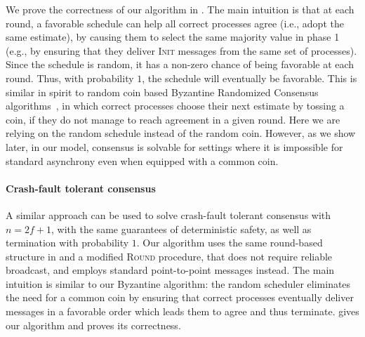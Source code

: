 We prove the correctness of our algorithm in . The main intuition is that at each round, a favorable schedule can help all correct processes agree (i.e., adopt the same estimate), by causing them to select the same majority value in phase 1 (e.g., by ensuring that they deliver \textsc{Init} messages from the same set of processes). Since the schedule is random, it has a non-zero chance of being favorable at each round. Thus, with probability $1$, the schedule will eventually be favorable. This is similar in spirit to random coin based Byzantine Randomized Consensus algorithms~\cite{book}, in which correct processes choose their next estimate by tossing a coin, if they do not manage to reach agreement in a given round. Here we are relying on the random schedule instead of the random coin. However, as we show later, in our model, consensus is solvable for settings where it is impossible for standard asynchrony even when equipped with a common coin.%

\paragraph{Crash-fault tolerant consensus} A similar approach can be used to solve crash-fault tolerant consensus with $n=2f+1$, with the same guarantees of deterministic safety, as well as termination with probability $1$. Our algorithm uses the same round-based structure in  and a modified \textsc{Round} procedure, that does not require reliable broadcast, and employs standard point-to-point messages instead. The main intuition is similar to our Byzantine algorithm: the random scheduler eliminates the need for a common coin by ensuring that correct processes eventually deliver messages in a favorable order which leads them to agree and thus terminate.  gives our algorithm and proves its correctness.
